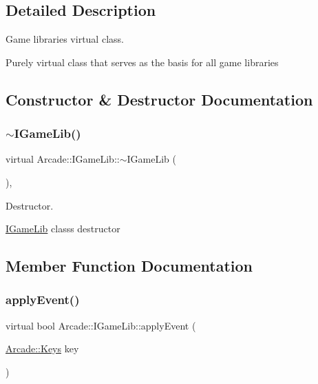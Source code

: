 \subsection{Detailed Description}
Game libraries virtual class. 

Purely virtual class that serves as the basis for all game libraries 

\subsection{Constructor \& Destructor Documentation}
\mbox{\label{class_arcade_1_1_i_game_lib_a3243f08b84930f3ff29d82d9a2a43582}} 
\subsubsection{\texorpdfstring{$\sim$\+I\+Game\+Lib()}{~IGameLib()}}
{\footnotesize\ttfamily virtual Arcade\+::\+I\+Game\+Lib\+::$\sim$\+I\+Game\+Lib (\begin{DoxyParamCaption}{ }\end{DoxyParamCaption})\hspace{0.3cm}{\ttfamily [virtual]}, {\ttfamily [default]}}



Destructor. 

\hyperlink{class_arcade_1_1_i_game_lib}{I\+Game\+Lib} class\textquotesingle{}s destructor 

\subsection{Member Function Documentation}
\mbox{\label{class_arcade_1_1_i_game_lib_a3b1b66ec00899b4c9efcd6151bf2497e}} 
\subsubsection{\texorpdfstring{apply\+Event()}{applyEvent()}}
{\footnotesize\ttfamily virtual bool Arcade\+::\+I\+Game\+Lib\+::apply\+Event (\begin{DoxyParamCaption}\item[{\hyperlink{namespace_arcade_a9b501908b20bc993e4f8226db5323c41}{Arcade\+::\+Keys}}]{key }\end{DoxyParamCaption})\hspace{0.3cm}{\ttfamily [pure virtual]}}



